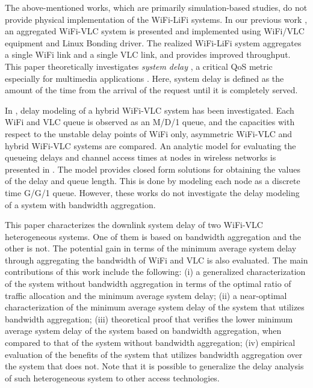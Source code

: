 \documentclass[10pt,journal]{IEEEtran}
\begin{document}
The above-mentioned works, which are primarily simulation-based studies, do not provide physical implementation of the WiFi-LiFi systems. In our previous work \cite{ShaoJOCN2015}, an aggregated WiFi-VLC system is presented and implemented using WiFi/VLC equipment and Linux Bonding driver. The realized WiFi-LiFi system aggregates a single WiFi link and a single VLC link, and provides improved throughput. This paper theoretically investigates {\it system delay} , a critical QoS metric especially for multimedia applications \cite{rahaim2011hybrid}. Here, system delay is defined as the amount of the time from the arrival of the request until it is completely served.

In \cite{rahaim2011hybrid}, delay modeling of a hybrid WiFi-VLC system has been investigated. Each WiFi and VLC queue is observed as an M/D/1 queue, and the capacities with respect to the unstable delay points of WiFi only, asymmetric WiFi-VLC and hybrid WiFi-VLC systems are compared. An analytic model for evaluating the queueing delays and channel access times at nodes in wireless networks is presented in \cite{tickoo2008modeling}. The model provides closed form solutions for obtaining the values of the delay and queue length. This is done by modeling each node as a discrete time G/G/1 queue. However, these works do not investigate the delay modeling of a system with bandwidth aggregation.


This paper characterizes the downlink system delay of two WiFi-VLC heterogeneous systems. One of them is based on bandwidth aggregation and the other is not. The potential gain in terms of the minimum average system delay through aggregating the bandwidth of WiFi and VLC is also evaluated. The main contributions of this work include the following: (i) a generalized characterization of the system without bandwidth aggregation in terms of the optimal ratio of traffic allocation and the minimum average system delay; (ii) a near-optimal characterization of the minimum average system delay of the system that utilizes bandwidth aggregation; (iii) theoretical proof that verifies the lower minimum average system delay of the system based on bandwidth aggregation, when compared to that of the system without bandwidth aggregation; (iv) empirical evaluation of the benefits of the system that utilizes bandwidth aggregation over the system that does not. Note that it is possible to generalize the delay analysis of such heterogeneous system to other access technologies.
\end{document}
